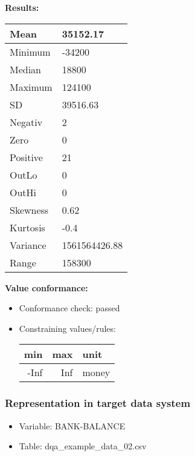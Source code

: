 \documentclass[
]{article}
\providecommand{\tightlist}{%
  \setlength{\itemsep}{0pt}\setlength{\parskip}{0pt}}
\begin{document}
\textbf{Results:}\\

\begin{table}[H]
\centering
\begin{tabular}{l|l}
\hline
Mean & 35152.17\\
\hline
Minimum & -34200\\
\hline
Median & 18800\\
\hline
Maximum & 124100\\
\hline
SD & 39516.63\\
\hline
Negativ & 2\\
\hline
Zero & 0\\
\hline
Positive & 21\\
\hline
OutLo & 0\\
\hline
OutHi & 0\\
\hline
Skewness & 0.62\\
\hline
Kurtosis & -0.4\\
\hline
Variance & 1561564426.88\\
\hline
Range & 158300\\
\hline
\end{tabular}
\end{table}

\textbf{Value conformance:}

\begin{itemize}
\tightlist
\item
  Conformance check: passed
\item
  Constraining values/rules:

  \begin{table}[H]
  \centering
  \begin{tabular}{r|r|l}
  \hline
  \textbf{min} & \textbf{max} & \textbf{unit}\\
  \hline
  -Inf & Inf & money\\
  \hline
  \end{tabular}
  \end{table}
\end{itemize}

\newpage

\hypertarget{representation-in-target-data-system-4}{%
\subsubsection{\texorpdfstring{Representation in \textbf{target} data
system}{Representation in target data system}}\label{representation-in-target-data-system-4}}

\begin{itemize}
\tightlist
\item
  Variable: BANK-BALANCE
\item
  Table: dqa\_example\_data\_02.csv
\end{itemize}
\end{document}
